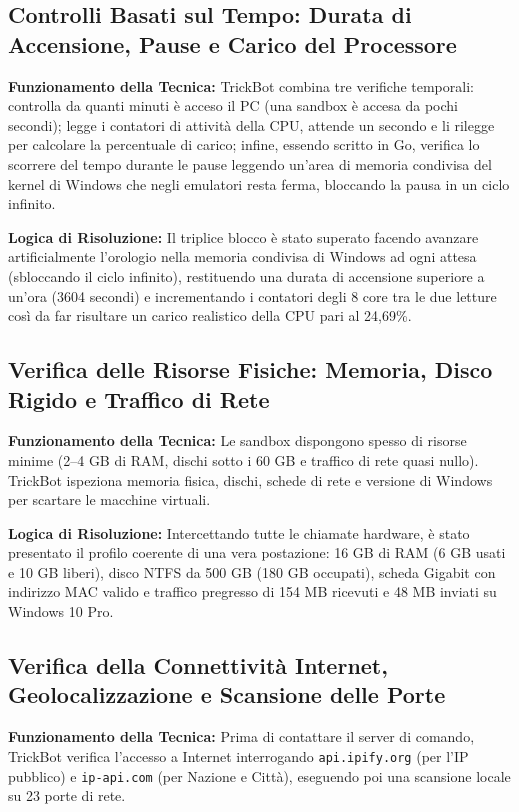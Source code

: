 \documentclass[11pt, a4paper]{article}
\begin{document}
	\subsection{Controlli Basati sul Tempo: Durata di Accensione, Pause e Carico del Processore}
	
	\textbf{Funzionamento della Tecnica:} TrickBot combina tre verifiche temporali: controlla da quanti minuti è acceso il PC (una sandbox è accesa da pochi secondi); legge i contatori di attività della CPU, attende un secondo e li rilegge per calcolare la percentuale di carico; infine, essendo scritto in Go, verifica lo scorrere del tempo durante le pause leggendo un'area di memoria condivisa del kernel di Windows che negli emulatori resta ferma, bloccando la pausa in un ciclo infinito.
	
	\textbf{Logica di Risoluzione:} Il triplice blocco è stato superato facendo avanzare artificialmente l'orologio nella memoria condivisa di Windows ad ogni attesa (sbloccando il ciclo infinito), restituendo una durata di accensione superiore a un'ora (3604 secondi) e incrementando i contatori degli 8 core tra le due letture così da far risultare un carico realistico della CPU pari al 24,69\%.
	
	\subsection{Verifica delle Risorse Fisiche: Memoria, Disco Rigido e Traffico di Rete}
	
	\textbf{Funzionamento della Tecnica:} Le sandbox dispongono spesso di risorse minime (2--4 GB di RAM, dischi sotto i 60 GB e traffico di rete quasi nullo). TrickBot ispeziona memoria fisica, dischi, schede di rete e versione di Windows per scartare le macchine virtuali.
	
	\textbf{Logica di Risoluzione:} Intercettando tutte le chiamate hardware, è stato presentato il profilo coerente di una vera postazione: 16 GB di RAM (6 GB usati e 10 GB liberi), disco NTFS da 500 GB (180 GB occupati), scheda Gigabit con indirizzo MAC valido e traffico pregresso di 154 MB ricevuti e 48 MB inviati su Windows 10 Pro.
	
	\subsection{Verifica della Connettività Internet, Geolocalizzazione e Scansione delle Porte}
	
	\textbf{Funzionamento della Tecnica:} Prima di contattare il server di comando, TrickBot verifica l'accesso a Internet interrogando \texttt{api.ipify.org} (per l'IP pubblico) e \texttt{ip-api.com} (per Nazione e Città), eseguendo poi una scansione locale su 23 porte di rete.
	
\end{document}
